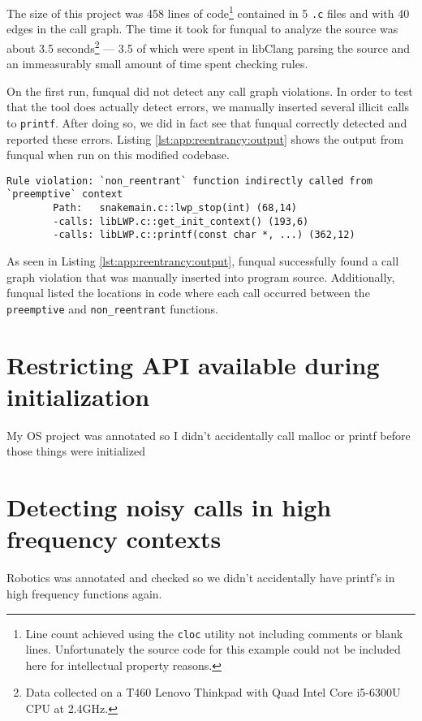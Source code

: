 The size of this project was 458 lines of code\footnote{Line count achieved using the \lstinline{cloc} utility not including comments or blank lines.  Unfortunately the source code for this example could not be included here for intellectual property reasons.} contained in 5 \lstinline{.c} files and with 40 edges in the call graph.  The time it took for funqual to analyze the source was about 3.5 seconds\footnote{Data collected on a T460 Lenovo Thinkpad with Quad Intel Core i5-6300U CPU at 2.4GHz.} --- 3.5 of which were spent in libClang parsing the source and an immeasurably small amount of time spent checking rules. 

On the first run, funqual did not detect any call graph violations.  In order to test that the tool does actually detect errors, we manually inserted several illicit calls to \lstinline{printf}.  After doing so, we did in fact see that funqual correctly detected and reported these errors.  Listing \ref{lst:app:reentrancy:output} shows the output from funqual when run on this modified codebase.

\noindent\begin{minipage}[t]{\linewidth}
\begin{lstlisting}[caption={Output from funqual when run on a project that had manually-inserted call graph violations},label={lst:app:reentrancy:output}]
Rule violation: `non_reentrant` function indirectly called from `preemptive` context
        Path:   snakemain.c::lwp_stop(int) (68,14)
        -calls: libLWP.c::get_init_context() (193,6)
        -calls: libLWP.c::printf(const char *, ...) (362,12)
\end{lstlisting}
\end{minipage}

As seen in Listing \ref{lst:app:reentrancy:output}, funqual successfully found a call graph violation that was manually inserted into program source.  Additionally, funqual listed the locations in code where each call occurred between the \lstinline{preemptive} and \lstinline{non_reentrant} functions.  

\section{Restricting API available during initialization}\label{sec:app:pre-malloc}

My OS project was annotated so I didn't accidentally call malloc or printf before those things were initialized

\section{Detecting noisy calls in high frequency contexts}\label{sec:app:blocking}

Robotics was annotated and checked so we didn't accidentally have printf's in high frequency functions again.
